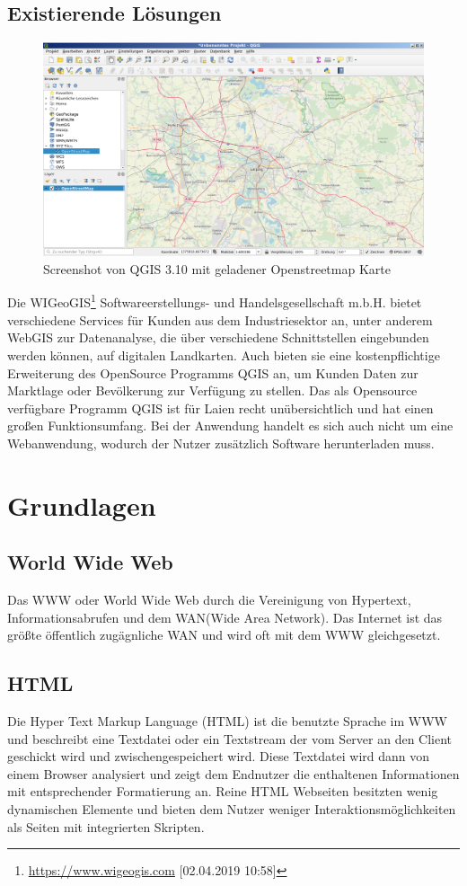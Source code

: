 \documentclass[a4paper, 12pt]{scrreprt}
\begin{document}
\section{Existierende Lösungen}
\begin{figure}[h]
\includegraphics[width=\linewidth]{qgis_oberflaeche.png}
\caption{Screenshot von QGIS 3.10 mit geladener Openstreetmap Karte}
\end{figure}
Die WIGeoGIS\footnote{\url{https://www.wigeogis.com} [02.04.2019 10:58]} Softwareerstellungs- und Handelsgesellschaft m.b.H. bietet verschiedene Services für Kunden aus dem Industriesektor an, unter anderem WebGIS zur Datenanalyse, die über verschiedene Schnittstellen eingebunden werden können, auf digitalen Landkarten. 
Auch bieten sie eine kostenpflichtige Erweiterung des OpenSource Programms QGIS an, um Kunden Daten zur Marktlage oder Bevölkerung zur Verfügung zu stellen.
Das als Opensource verfügbare Programm QGIS ist für Laien recht unübersichtlich und hat einen großen Funktionsumfang.
Bei der Anwendung handelt es sich auch nicht um eine Webanwendung, wodurch der Nutzer zusätzlich Software herunterladen muss.\\

\chapter{Grundlagen}
\section{World Wide Web}
Das WWW oder World Wide Web\cite{berners1992world} durch die Vereinigung von Hypertext, Informationsabrufen und dem WAN(Wide Area Network).
Das Internet ist das größte öffentlich zugägnliche WAN und wird oft mit dem WWW gleichgesetzt.
\section{HTML}
Die Hyper Text Markup Language (HTML) ist die benutzte Sprache im WWW und beschreibt eine Textdatei oder ein Textstream der vom Server an den Client geschickt wird und zwischengespeichert wird.
Diese Textdatei wird dann von einem Browser analysiert und zeigt dem Endnutzer die enthaltenen Informationen mit entsprechender Formatierung an.
Reine HTML Webseiten besitzten wenig dynamischen Elemente und bieten dem Nutzer weniger Interaktionsmöglichkeiten als Seiten mit integrierten Skripten.
\end{document}
